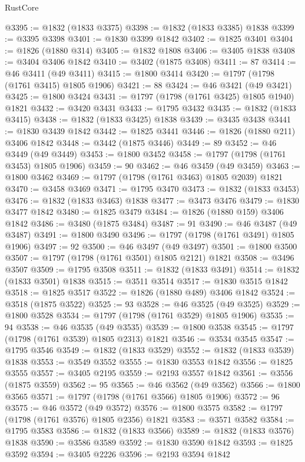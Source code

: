 \begin{lexlean}{RustCore}
\begin{coremodule}
@3395 := @1832 (@1833 @3375)
@3398 := @1832 (@1833 @3385) @1838
@3399 := @3395 @3398
@3401 := @1830 @3399 @1842
@3402 := @1825 @3401
@3404 := @1826 (@1880 @314)
@3405 := @1832 @1808
@3406 := @3405 @1838
@3408 := @3404 @3406 @1842
@3410 := @3402 (@1875 @3408)
@3411 := 87
@3414 := @46 @3411 (@49 @3411)
@3415 := @1800 @3414
@3420 := @1797 (@1798 (@1761 @3415) @1805 @1906)
@3421 := 88
@3424 := @46 @3421 (@49 @3421)
@3425 := @1800 @3424
@3431 := @1797 (@1798 (@1761 @3425) @1805 @1940) @1821
@3432 := @3420 @3431
@3433 := @1795 @3432
@3435 := @1832 (@1833 @3415)
@3438 := @1832 (@1833 @3425) @1838
@3439 := @3435 @3438
@3441 := @1830 @3439 @1842
@3442 := @1825 @3441
@3446 := @1826 (@1880 @211) @3406 @1842
@3448 := @3442 (@1875 @3446)
@3449 := 89
@3452 := @46 @3449 (@49 @3449)
@3453 := @1800 @3452
@3458 := @1797 (@1798 (@1761 @3453) @1805 @1906)
@3459 := 90
@3462 := @46 @3459 (@49 @3459)
@3463 := @1800 @3462
@3469 := @1797 (@1798 (@1761 @3463) @1805 @2039) @1821
@3470 := @3458 @3469
@3471 := @1795 @3470
@3473 := @1832 (@1833 @3453)
@3476 := @1832 (@1833 @3463) @1838
@3477 := @3473 @3476
@3479 := @1830 @3477 @1842
@3480 := @1825 @3479
@3484 := @1826 (@1880 @159) @3406 @1842
@3486 := @3480 (@1875 @3484)
@3487 := 91
@3490 := @46 @3487 (@49 @3487)
@3491 := @1800 @3490
@3496 := @1797 (@1798 (@1761 @3491) @1805 @1906)
@3497 := 92
@3500 := @46 @3497 (@49 @3497)
@3501 := @1800 @3500
@3507 := @1797 (@1798 (@1761 @3501) @1805 @2121) @1821
@3508 := @3496 @3507
@3509 := @1795 @3508
@3511 := @1832 (@1833 @3491)
@3514 := @1832 (@1833 @3501) @1838
@3515 := @3511 @3514
@3517 := @1830 @3515 @1842
@3518 := @1825 @3517
@3522 := @1826 (@1880 @489) @3406 @1842
@3524 := @3518 (@1875 @3522)
@3525 := 93
@3528 := @46 @3525 (@49 @3525)
@3529 := @1800 @3528
@3534 := @1797 (@1798 (@1761 @3529) @1805 @1906)
@3535 := 94
@3538 := @46 @3535 (@49 @3535)
@3539 := @1800 @3538
@3545 := @1797 (@1798 (@1761 @3539) @1805 @2313) @1821
@3546 := @3534 @3545
@3547 := @1795 @3546
@3549 := @1832 (@1833 @3529)
@3552 := @1832 (@1833 @3539) @1838
@3553 := @3549 @3552
@3555 := @1830 @3553 @1842
@3556 := @1825 @3555
@3557 := @3405 @2195
@3559 := @2193 @3557 @1842
@3561 := @3556 (@1875 @3559)
@3562 := 95
@3565 := @46 @3562 (@49 @3562)
@3566 := @1800 @3565
@3571 := @1797 (@1798 (@1761 @3566) @1805 @1906)
@3572 := 96
@3575 := @46 @3572 (@49 @3572)
@3576 := @1800 @3575
@3582 := @1797 (@1798 (@1761 @3576) @1805 @2356) @1821
@3583 := @3571 @3582
@3584 := @1795 @3583
@3586 := @1832 (@1833 @3566)
@3589 := @1832 (@1833 @3576) @1838
@3590 := @3586 @3589
@3592 := @1830 @3590 @1842
@3593 := @1825 @3592
@3594 := @3405 @2226
@3596 := @2193 @3594 @1842

\end{coremodule}
\end{lexlean}
